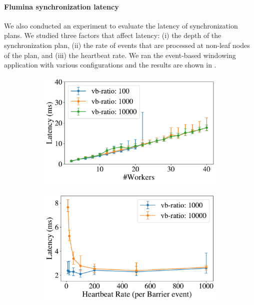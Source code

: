 \paragraph{Flumina synchronization latency}
\label{dgs:ssec:latency-eval}
We also conducted an experiment to evaluate the latency of synchronization plans. We studied three factors that affect latency: (i) the depth of the synchronization plan, (ii) the rate of events that are processed at non-leaf nodes of the plan, and (iii) the heartbeat rate. We ran the event-based windowing application with various configurations and the results are shown in .
\begin{figure}[t]
    \centering
    \begin{subfigure}[t]{0.45\columnwidth}
      \includegraphics[width=\textwidth]{figures/dgs/synchronization_cost_ratios_nodes}
    \end{subfigure}
    \begin{subfigure}[t]{0.45\columnwidth}
      \includegraphics[width=\textwidth]{figures/dgs/synchronization_cost_heartbeats_ratios}

\end{subfigure}
\end{figure}
